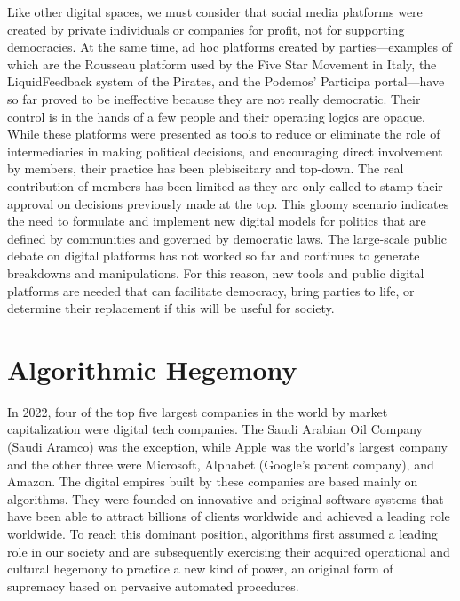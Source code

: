 Like other digital spaces, we must consider that social media platforms were created by private individuals or companies for profit, not for supporting democracies. At the same time, ad hoc platforms created by parties---examples of which are the Rousseau platform used by the Five Star Movement in Italy, the LiquidFeedback system of the Pirates, and the Podemos' Participa portal---have so far proved to be ineffective because they are not really\vadjust{\vspace*{-17pt}\pagebreak} democratic. Their control is in the hands of a few people and their operating logics are opaque. While these platforms were presented as tools to reduce or eliminate the role of intermediaries in making political decisions, and encouraging direct involvement by members, their practice has been plebiscitary and top-down. The real contribution of members has been limited as they are only called to stamp their approval on decisions previously made at the top. This gloomy scenario indicates the need to formulate and implement new digital models for politics that are defined by communities and governed by democratic laws. The large-scale public debate on digital platforms has not worked so far and continues to generate breakdowns and manipulations. For this reason, new tools and public digital platforms are needed that can facilitate democracy, bring parties to life, or determine their replacement if this will be useful for society.

\section{\label{sec:8.3}Algorithmic Hegemony}

In 2022, four of the top five largest companies in the world by market capitalization were digital tech companies. The Saudi Arabian Oil Company (Saudi Aramco) was the exception, while Apple was the world's largest company and the other three were Microsoft, Alphabet (Google's parent company), and Amazon. The digital empires built by these companies are based mainly on algorithms. They were founded on innovative and original software systems that have been able to attract billions of clients worldwide and achieved a leading role worldwide. To reach this dominant position, algorithms first assumed a leading role in our society and are subsequently exercising their acquired operational and cultural hegemony to practice a new kind of power, an original form of supremacy based on pervasive automated procedures.

